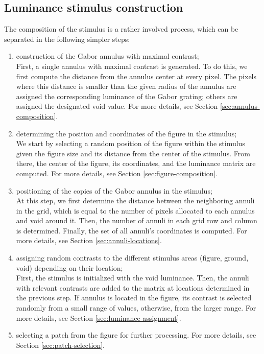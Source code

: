 \subsection{Luminance stimulus construction}

The composition of the stimulus is a rather involved process, which can be separated in the following simpler steps:
\begin{enumerate}
    \item construction of the Gabor annulus with maximal contrast; \\
    First, a single annulus with maximal contrast is generated. To do this, we first compute the distance from the annulus center at every pixel. The pixels where this distance is smaller than the given radius of the annulus are assigned the corresponding luminance of the Gabor grating; others are assigned the designated void value. For more details, see Section \ref{sec:annulus-composition}.
    
    \item determining the position and coordinates of the figure in the stimulus; \\
    We start by selecting a random position of the figure within the stimulus given the figure size and its distance from the center of the stimulus. From there, the center of the figure, its coordinates, and the luminance matrix are computed. For more details, see Section \ref{sec:figure-composition}.
    
    \item positioning of the copies of the Gabor annulus in the stimulus; \\
    At this step, we first determine the distance between the neighboring annuli in the grid, which is equal to the number of pixels allocated to each annulus and void around it. Then, the number of annuli in each grid row and column is determined. Finally, the set of all annuli's coordinates is computed. For more details, see Section \ref{sec:annuli-locations}.
    
    \item assigning random contrasts to the different stimulus areas (figure, ground, void) depending on their location; \\
    First, the stimulus is initialized with the void luminance. Then, the annuli with relevant contrasts are added to the matrix at locations determined in the previous step. If annulus is located in the figure, its contrast is selected randomly from a small range of values, otherwise, from the larger range. For more details, see Section \ref{sec:luminance-assignment}.
    
    \item selecting a patch from the figure for further processing. For more details, see Section \ref{sec:patch-selection}.
\end{enumerate}

